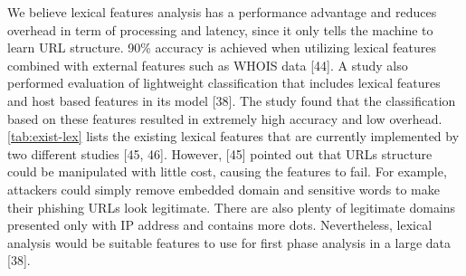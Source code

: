 We believe lexical features analysis has a performance advantage and
reduces overhead in term of processing and latency, since it only
tells the machine to learn URL structure. 90\% accuracy is achieved
when utilizing lexical features combined with external features such
as WHOIS data {[}44{]}. A study also performed evaluation of lightweight
classification that includes lexical features and host based features
in its model {[}38{]}. The study found that the classification based
on these features resulted in extremely high accuracy and low overhead.
\autoref{tab:exist-lex} lists the existing lexical features that
are currently implemented by two different studies {[}45, 46{]}. However,
{[}45{]} pointed out that URLs structure could be manipulated with
little cost, causing the features to fail. For example, attackers
could simply remove embedded domain and sensitive words to make their
phishing URLs look legitimate. There are also plenty of legitimate
domains presented only with IP address and contains more dots. Nevertheless,
lexical analysis would be suitable features to use for first phase
analysis in a large data {[}38{]}.

